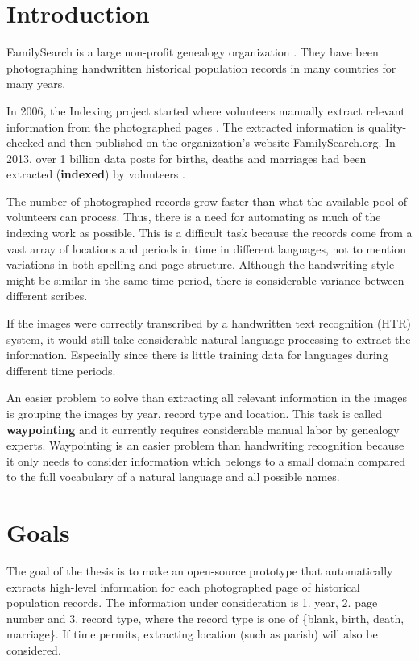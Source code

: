 

\section{Introduction}

FamilySearch is a large non-profit genealogy organization \cite{FamilySearchAbout}. They have been photographing handwritten historical population records in many countries for many years.

In 2006, the Indexing project started where volunteers manually extract relevant information from the photographed pages \cite{Indexing}. The extracted information is quality-checked and then published on the organization's website FamilySearch.org. In 2013, over 1 billion data posts for births, deaths and marriages had been extracted (\textbf{indexed}) by volunteers \cite{Billion}.

The number of photographed records grow faster than what the available pool of volunteers can process. Thus, there is a need for automating as much of the indexing work as possible. This is a difficult task because the records come from a vast array of locations and periods in time in different languages, not to mention variations in both spelling and page structure. Although the handwriting style might be similar in the same time period, there is considerable variance between different scribes.

If the images were correctly transcribed by a handwritten text recognition (HTR) system, it would still take considerable natural language processing to extract the information. Especially since there is little training data for languages during different time periods.

An easier problem to solve than extracting all relevant information in the images is grouping the images by year, record type and location. This task is called \textbf{waypointing} \cite{Waypointing} and it currently requires considerable manual labor by genealogy experts.
Waypointing is an easier problem than handwriting recognition because it only needs to consider information which belongs to a small domain compared to the full vocabulary of a natural language and all possible names.

\section{Goals}

The goal of the thesis is to make an open-source prototype that automatically extracts high-level information for each photographed page of historical population records. The information under consideration is 1. year, 2. page number and 3. record type, where the record type is one of \{blank, birth, death, marriage\}.
If time permits, extracting location (such as parish) will also be considered.

